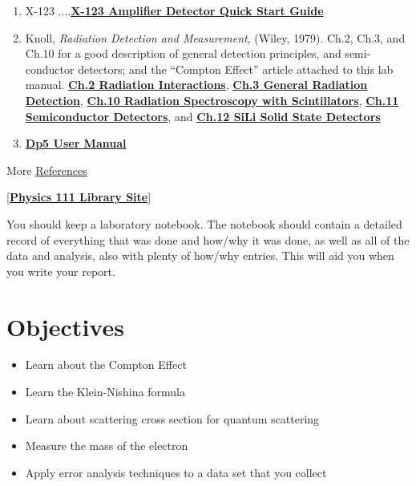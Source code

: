 \documentclass{../lab}
\begin{document}
\begin{enumerate}
    \item X-123 ....\href{http://experimentationlab.berkeley.edu/sites/default/files/images/X-123.pdf}{\textbf{X-123 Amplifier Detector Quick Start Guide}}

    \item Knoll, \emph{Radiation Detection and Measurement}, (Wiley, 1979). Ch.2, Ch.3, and Ch.10 for a good description of general detection principles, and semi-conductor detectors; and the ``Compton Effect'' article attached to this lab manual. \href{http://physics111.lib.berkeley.edu/Physics111/Reprints/COM/01-Radiation\_Detection\_and\_Measurement\_CH\_02.pdf}{\textbf{Ch.2 Radiation Interactions}}, \href{http://physics111.lib.berkeley.edu/Physics111/Reprints/COM/01-Radiation\_Detection\_and\_Measurement\_CH\_03.pdf}{\textbf{Ch.3 General Radiation Detection}},  \href{http://physics111.lib.berkeley.edu/Physics111/Reprints/COM/01-Radiation\_Detection\_and\_Measurement\_CH\_10.pdf}{\textbf{Ch.10 Radiation Spectroscopy with Scintillators}}, \href{http://physics111.lib.berkeley.edu/Physics111/Reprints/COM/01-Radiation\_Detection\_and\_Measurement\_CH\_11.pdf}{\textbf{Ch.11 Semiconductor Detectors}}, and \href{http://physics111.lib.berkeley.edu/Physics111/Reprints/COM/Knoll\_ch.\%2012\%20lithium-drifted\%20germanium\%20detectors.pdf}{\textbf{Ch.12 SiLi Solid State Detectors}}

    \item \href{http://experimentationlab.berkeley.edu/sites/default/files/images/DP5\_User\_Manual\_A1.pdf}{\textbf{Dp5 User Manual}}

\end{enumerate}

More \hyperref[sec:References]{References}

[\href{\LabReprints}{\textbf{Physics 111 Library Site}}]

You should keep a laboratory notebook. The notebook should contain a detailed record of everything that was done and how/why it was done, as well as all of the data and analysis, also with plenty of how/why entries. This will aid you when you write your report.

\section{Objectives}

\begin{itemize}
    \item Learn about the Compton Effect

    \item Learn the Klein-Nishina formula

    \item Learn about scattering cross section for quantum scattering

    \item Measure the mass of the electron

    \item Apply error analysis techniques to a data set that you collect

\end{itemize}
\end{document}

